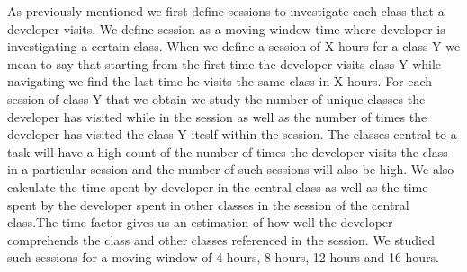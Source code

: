 As previously mentioned we first define sessions to investigate each class that a developer visits. We define session as a moving window time where developer is investigating a certain class. When we define a session of X hours for a class Y we mean to say that starting from the first time the developer visits class Y while navigating we find the last time he visits the same class in X hours. For each session of class Y that we obtain we study the number of unique classes the developer has visited while in the session as well as the number of times the developer has visited the class Y iteslf within the session. The classes central to a task will have a high count of the number of times the developer visits the class in a particular session and the number of such sessions will also be high. We also calculate the time spent by developer in the central class as well as the time spent by the developer spent in other classes in the session of the central class.The time factor gives us an estimation of how well the developer comprehends the class and other classes referenced in the session. We studied such sessions for a moving window of 4 hours, 8 hours, 12 hours and 16 hours. 

